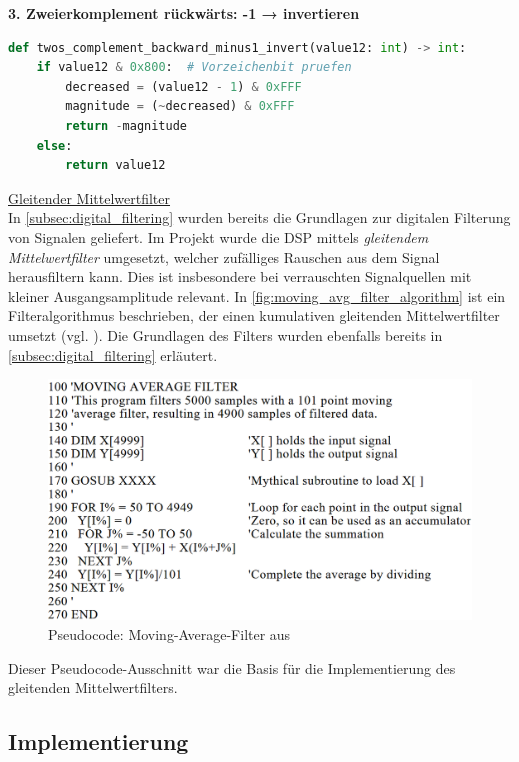 \documentclass[a4paper, portrait, 12pt]{scrartcl} %
\begin{document}
\textbf{3. Zweierkomplement rückwärts: -1 → invertieren}
\begin{lstlisting}[language=Python, caption=Alternative zu 2.: Erst -1 $\rightarrow$ dann invertieren.]
def twos_complement_backward_minus1_invert(value12: int) -> int:
	if value12 & 0x800:  # Vorzeichenbit pruefen
		decreased = (value12 - 1) & 0xFFF
		magnitude = (~decreased) & 0xFFF
		return -magnitude
	else:
		return value12
\end{lstlisting}

\underline{Gleitender Mittelwertfilter}\\
In \autoref{subsec:digital_filtering} wurden bereits die Grundlagen zur digitalen Filterung von Signalen geliefert. Im Projekt wurde die DSP mittels \emph{gleitendem Mittelwertfilter} umgesetzt, welcher zufälliges Rauschen aus dem Signal herausfiltern kann. Dies ist insbesondere bei verrauschten Signalquellen mit kleiner Ausgangsamplitude relevant. In \autoref{fig:moving_avg_filter_algorithm} ist ein Filteralgorithmus beschrieben, der einen kumulativen gleitenden Mittelwertfilter umsetzt (vgl. \cite[S. 277-284]{Smith1999}). Die Grundlagen des Filters wurden ebenfalls bereits in \autoref{subsec:digital_filtering} erläutert.

\begin{figure}[H]
	\centering
    \includegraphics[scale=0.4]{moving_average_filter_algorithm_smith.png} 
	\caption{Pseudocode: Moving-Average-Filter aus \cite[S. 278]{Smith1999}}
	\label{fig:moving_avg_filter_algorithm}
\end{figure}

Dieser Pseudocode-Ausschnitt war die Basis für die Implementierung des gleitenden Mittelwertfilters.
\pagebreak

\subsection{Implementierung}
\end{document}
